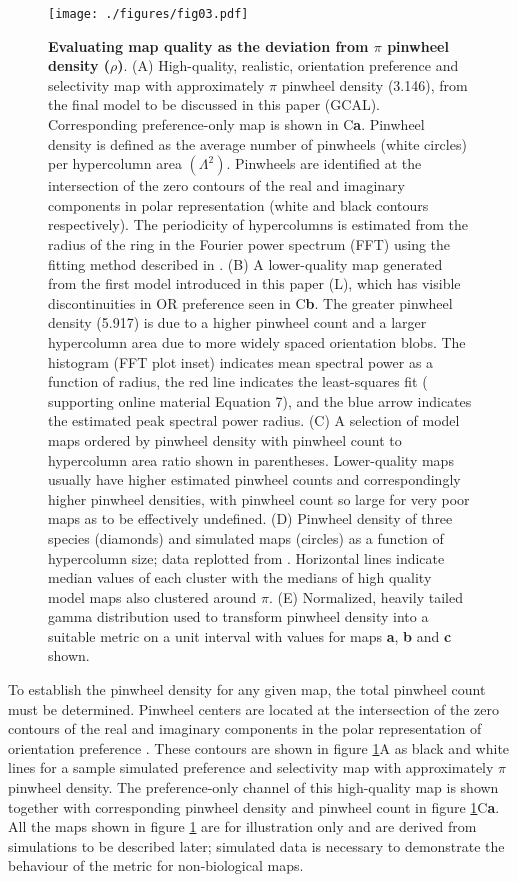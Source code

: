 \documentclass{article}
\def \scalefactor {0.666666}
\def \metricScale {\scalefactor}           %
\begin{document}
\begin{figure}
\centerline{
\texttt{[image: ./figures/fig03.pdf]}
}
\caption[]{ \textbf{Evaluating map quality as the deviation from $\pi$
    pinwheel density ($\rho$)}.  (A) High-quality, realistic,
  orientation preference and selectivity map with approximately $\pi$
  pinwheel density (3.146), from the final model to be discussed in
  this paper (GCAL).  Corresponding preference-only map is shown in C{\bf a}.
  Pinwheel density is defined as the average number of
  pinwheels (white circles) per hypercolumn area $(\Lambda^2)$. Pinwheels are
  identified at the intersection of the zero contours of the real and
  imaginary components in polar representation (white and black
  contours respectively).
  The periodicity of hypercolumns is estimated from the radius of the
  ring in the Fourier power spectrum (FFT) using the fitting method
  described in \citet{Kaschube2010}. (B) A lower-quality map generated
  from the first model introduced in this paper (L), which has visible
  discontinuities in OR preference seen in C{\bf b}. The greater
  pinwheel density (5.917) is due to a higher pinwheel count and a
  larger hypercolumn area due to more widely spaced orientation blobs.
  The histogram (FFT plot inset) indicates mean spectral power as a
  function of radius, the red line indicates the least-squares fit 
  (\citet{Kaschube2010} supporting online material Equation 7), and
  the blue arrow indicates the estimated peak spectral power radius. (C)
  A selection of model maps ordered by pinwheel density with pinwheel
  count to hypercolumn area ratio shown in  parentheses.
  Lower-quality maps usually have higher estimated
  pinwheel counts and correspondingly higher pinwheel densities, with
  pinwheel count so large for very poor maps as to be effectively
  undefined. (D) Pinwheel density of three species
  (diamonds) and simulated maps (circles) as a function of hypercolumn
  size; data replotted from \citet{Kaschube2010}.  Horizontal lines
  indicate median values of each cluster with the medians of high
  quality model maps also clustered around $\pi$.
  (E) Normalized, heavily tailed gamma distribution used to transform
  pinwheel density into a suitable metric on a unit interval with
  values for maps {\bf a}, {\bf b} and {\bf c} shown.}
  \label{fig:metric}
\end{figure}

To establish the pinwheel density for any given map, the total
pinwheel count must be determined. Pinwheel centers are located at the
intersection of the zero contours of the real and imaginary components
in the polar representation of orientation preference
\citep{Lowel1998}. These contours are shown in figure
\ref{fig:metric}A as black and white lines for a sample simulated
preference and selectivity map with approximately $\pi$ pinwheel
density. The preference-only channel of this high-quality map is shown
together with corresponding pinwheel density and pinwheel count in
figure \ref{fig:metric}C{\bf a}. All the maps shown in figure
\ref{fig:metric} are for illustration only and are derived from
simulations to be described later; simulated data is necessary to
demonstrate the behaviour of the metric for non-biological maps.
\end{document}
